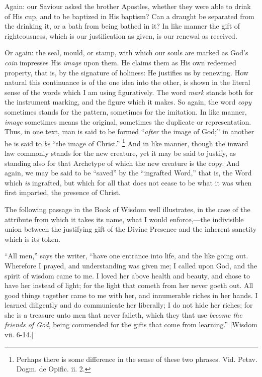 Again: our Saviour asked the brother Apostles, whether they were
able to drink of His cup, and to be baptized in His baptism? Can a
draught be separated from the drinking it, or a bath from being bathed
in it? In like manner the gift of righteousness, which is our
justification as given, is our renewal as received.

Or again: the seal, mould, or stamp, with which our souls are
marked as God's \emph{coin} impresses His \emph{image} upon them. He
claims them as His own redeemed property, that is, by the signature of
holiness: He justifies us by renewing. How natural this continuance is
of the one idea into the other, is shown in the literal sense of the
words which I am using figuratively. The word \emph{mark} stands both
for the instrument marking, and the figure which it makes. So again,
the word \emph{copy} sometimes stands for the pattern, sometimes for
the imitation. In like manner, \emph{image} sometimes means the
original, sometimes the duplicate or representation. Thus, in one
text, man is said to be formed ``\emph{after} the image of
God;'' in another he is said to \emph{be} ``the image of
Christ.'' \footnote{Perhaps there
is some difference in the sense of these two phrases. Vid. Petav. Dogm.
de Opific. ii. 2.} And in like
manner, though the inward law commonly stands for the new creature,
yet it may be said to justify, as standing also for that Archetype of
which the new creature is the copy. And again, we may be said to be
``saved'' by the ``ingrafted Word,'' that is, the Word
which \emph{is} ingrafted, but which for all that does not cease to be what
it was when first imparted, the presence of Christ.

The following passage in the Book of Wisdom well illustrates, in
the case of the attribute from which it takes its name, what I would
enforce,—the indivisible union between the justifying gift of the
Divine Presence and the inherent sanctity which is its token.

``All men,'' says the writer, ``have one entrance into
life, and the like going out. Wherefore I prayed, and understanding
was given me; I called upon God, and the spirit of wisdom came to me.
I loved her above health and beauty, and chose to have her instead of
light; for the light that cometh from her never goeth out. All good
things together came to me with her, and innumerable riches in her
hands. I learned diligently and do communicate her liberally; I do not
hide her riches; for she is a treasure unto men that never faileth,
which they that use \emph{become the friends of God}, being commended
for the gifts that come from learning.'' [Wisdom vii. 6-14.]

